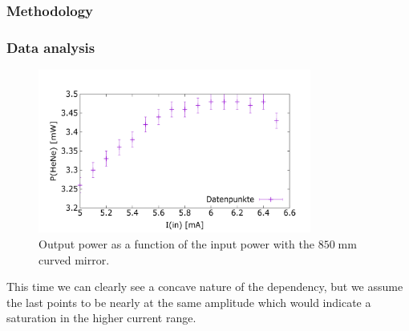 \documentclass[../main.tex]{subfiles}
\begin{document}
\subsubsection*{Methodology}
\subsubsection*{Data analysis}

    \begin{figure}
        \centering
        \includegraphics[width=0.8\textwidth]{Bilddateien/6/P(HeNe)overI(in).png}
        \caption{Output power as a function of the input power with the $850\;\si{\mm}$ curved mirror.}
        \label{fig:output_power_over_input_power_curved}
    \end{figure}

    This time we can clearly see a concave nature of the dependency, but we assume the last points to be nearly at the same amplitude which would indicate a saturation in the higher current range. 
\end{document}
